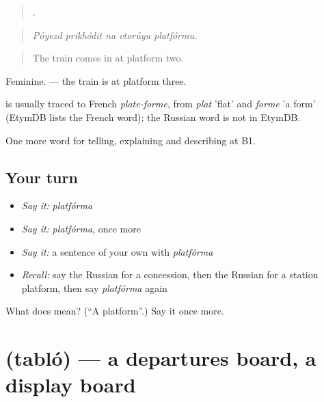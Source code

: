 \begin{quote}
    .
\end{quote}

\begin{quote}
\emph{Póyezd prikhódit na vtorúyu platfórmu.}
\end{quote}

\begin{quote}
The train comes in at platform two.
\end{quote}

Feminine. \emph{    } — the train is at platform three.

\begin{cousinweb}
\emph{} is usually traced to French \emph{plate-forme}, from \emph{plat} 'flat' and \emph{forme} 'a form' (EtymDB lists the French word); the Russian word is not in EtymDB.
\end{cousinweb}

\begin{grammarlens}[title={What you've built}]
One more word for telling, explaining and describing at B1.
\end{grammarlens}

\subsection*{Your turn}
\begin{itemize}
\raggedright
  \item \emph{Say it:} \emph{platfórma}
  \item \emph{Say it:} \emph{platfórma}, once more
  \item \emph{Say it:} a sentence of your own with \emph{platfórma}
  \item \emph{Recall:} say the Russian for a concession, then the Russian for a station platform, then say \emph{platfórma} again
\end{itemize}

\begin{tcolorbox}[breakable,colback=teal!4,colframe=teal!35!black,title={Before you move on}]
What does  mean? (\textquotedblleft{}A platform\textquotedblright{}.) Say it once more.
\end{tcolorbox}
\section[\texorpdfstring{\ru{табло} (tabló)}{табло (tabló)}]{ (tabló) — a departures board, a display board}


